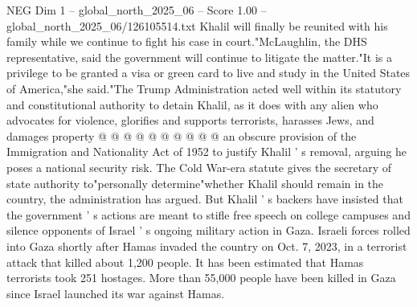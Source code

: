 \begin{textsample}{NEG Dim 1 – global\_north\_2025\_06 – Score 1.00 – global\_north\_2025\_06/126105514.txt}
Khalil will finally be reunited with his family while we continue to fight his case in court."McLaughlin, the DHS representative, said the government will continue to litigate the matter."It is a privilege to be granted a visa or green card to live and study in the United States of America,"she said."The Trump Administration acted well within its statutory and constitutional authority to detain Khalil, as it does with any alien who advocates for violence, glorifies and supports terrorists, harasses Jews, and damages property @ @ @ @ @ @ @ @ @ @ an obscure provision of the Immigration and Nationality Act of 1952 to justify Khalil ' s removal, arguing he poses a national security risk.
The Cold War-era statute gives the secretary of state authority to"personally determine"whether Khalil should remain in the country, the administration has argued.
But Khalil ' s backers have insisted that the government ' s actions are meant to stifle free speech on college campuses and silence opponents of Israel ' s ongoing military action in Gaza.
Israeli forces rolled into Gaza shortly after Hamas invaded the country on Oct. 7, 2023, in a terrorist attack that killed about 1,200 people.
It has been estimated that Hamas terrorists took 251 hostages.
More than 55,000 people have been killed in Gaza since Israel launched its war against Hamas.

\end{textsample}
